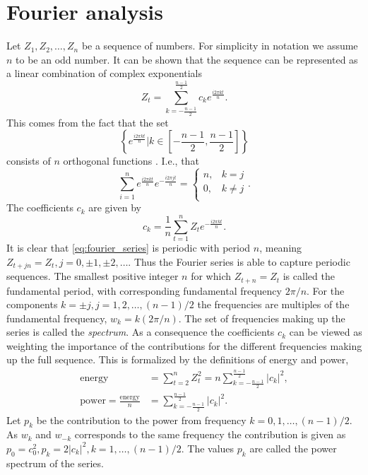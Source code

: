\documentclass[a4paper]{memoir}
\theoremstyle{plain}
\theoremstyle{definition}
\theoremstyle{remark}
\begin{document}
\section{Fourier analysis}
Let $Z_1, Z_2, \hdots, Z_n$ be a sequence of numbers.
For simplicity in notation we assume $n$ to be an odd number.
It can be shown that the sequence can be represented as a linear combination of complex exponentials
\begin{equation}\label{eq:fourier_series}
        Z_t = \sum_{k = -\frac{n-1}{2}}^{\frac{n- 1}{2}}c_k e^{\frac{i2 \pi k t}{n}}.
\end{equation}
This comes from the fact that the set 
\begin{equation*}
        \left\{ e^{\frac{i 2 \pi kt}{n}} \Big| k \in \left[ -\frac{n -1}{2}, \frac{n - 1}{2} \right] \right\}
\end{equation*}
consists of $n$ orthogonal functions \cite{wei}.
I.e., that
\begin{equation*}
        \sum_{i = 1}^{n} e^{\frac{i2 \pi kt}{n}} e^{-\frac{i 2 \pi j t}{n}}= 
                \begin{cases}
                        n, & k = j \\
                        0, & k \neq j \\
                \end{cases}
       .
\end{equation*}
The coefficients $c_k$ are given by
\begin{equation*}
       c_k =  \frac{1}{n}\sum_{ t = 1}^{n}Z_t e^{-\frac{i 2\pi kt}{n}}.
\end{equation*}
It is clear that \eqref{eq:fourier_series} is periodic with period $n$, meaning $Z_{t + jn} = Z_t, j = 0, \pm 1, \pm 2, \hdots$.
Thus the Fourier series is able to capture periodic sequences.
The smallest positive integer $n$ for which $Z_{t + n} = Z_t$ is called the fundamental period, with corresponding fundamental frequency $2 \pi /n$.
For the components $k = \pm j, j = 1, 2, \hdots, (n-1)/2$ the frequencies are multiples of the fundamental frequency, $w_k = k(2\pi/n)$.
The set of frequencies making up the series is called the \textit{spectrum}.
As a consequence the coefficients $c_k$ can be viewed as weighting the importance of the contributions for the different frequencies making up the full sequence.
This is formalized by the definitions of energy and power,
\begin{align}\label{eq:energy}
        \text{energy} &= \sum_{t = 2}^{n} Z_t^2 = n \sum_{k = -\frac{n -1}{2}}^{\frac{n - 1}{2}} |c_k|^2 ,\\ 
        \label{eq:power}
        \text{power} = \frac{\text{energy}}{n} &= \sum_{k = -\frac{n -1}{2}}^{\frac{n - 1}{2}} |c_k|^2. 
\end{align}
Let $p_k$ be the contribution to the power from frequency $k = 0, 1, \hdots, (n-1)/2$.
As $w_k$ and $w_{-k}$ corresponds to the same frequency the contribution is given as $p_0 = c_0^2, p_k = 2|c_k|^2, k = 1, \hdots, (n-1)/2$.
The values $p_k$ are called the power spectrum of the series.
\end{document}
